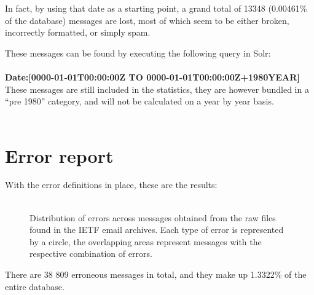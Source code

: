 \documentclass[a4paper,english]{report}
\begin{document}
In fact, by using that date as a starting point, a grand total of 13348 (0.00461\% of the database) messages are lost, most of which seem to be either broken, incorrectly formatted, or simply spam.

These messages can be found by executing the following query in Solr:\\\\
\noindent
\textbf{Date:[0000-01-01T00:00:00Z TO 0000-01-01T00:00:00Z+1980YEAR]}  \\

These messages are still included in the statistics, they are however bundled in a “pre 1980” category, and will not be calculated on a year by year basis.\\\\


\section{Error report}
With the error definitions in place, these are the results:\\\\

\begin{figure}[H]
\caption{Distribution of errors across messages obtained from the raw files found in the IETF email archives. Each type of error is represented by a circle, the overlapping areas represent messages with the respective combination of errors.}
\end {figure}

There are 38 809 erroneous messages in total, and they make up 1.3322\% of the entire database.\\\\
\end{document}

